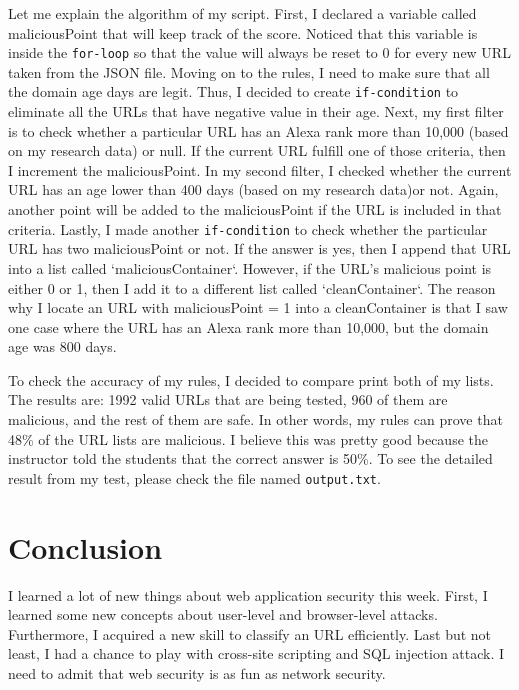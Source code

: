 \documentclass[letterpaper,10pt,titlepage,draftclsnofoot,onecolumn]{IEEEtran}
\begin{document}
Let me explain the algorithm of my script. 
First, I declared a variable called maliciousPoint that will keep track of the score.
Noticed that this variable is inside the \verb|for-loop| so that the value will always be reset to 0 for every new URL taken from the JSON file.
Moving on to the rules, I need to make sure that all the domain age days are legit.
Thus, I decided to create \verb|if-condition| to eliminate all the URLs that have negative value in their age. 
Next, my first filter is to check whether a particular URL has an Alexa rank more than 10,000 (based on my research data) or null.
If the current URL fulfill one of those criteria, then I increment the maliciousPoint. 
In my second filter, I checked whether the current URL has an age lower than 400 days (based on my research data)or not. 
Again, another point will be added to the maliciousPoint if the URL is included in that criteria.
Lastly, I made another \verb|if-condition| to check whether the particular URL has two maliciousPoint or not.
If the answer is yes, then I append that URL into a list called `maliciousContainer`.
However, if the URL's malicious point is either 0 or 1, then I add it to a different list called `cleanContainer`. 
The reason why I locate an URL with maliciousPoint = 1 into a cleanContainer is that I saw one case where the URL has an Alexa rank more than 10,000, but the domain age was 800 days.

To check the accuracy of my rules, I decided to compare print both of my lists.
The results are: 1992 valid URLs that are being tested, 960 of them are malicious, and the rest of them are safe.
In other words, my rules can prove that 48\% of the URL lists are malicious.
I believe this was pretty good because the instructor told the students that the correct answer is 50\%.
To see the detailed result from my test, please check the file named \verb|output.txt|.

\section{Conclusion}
I learned a lot of new things about web application security this week.
First, I learned some new concepts about user-level and browser-level attacks.
Furthermore, I acquired a new skill to classify an URL efficiently.
Last but not least, I had a chance to play with cross-site scripting and SQL injection attack.
I need to admit that web security is as fun as network security.
\end{document}
